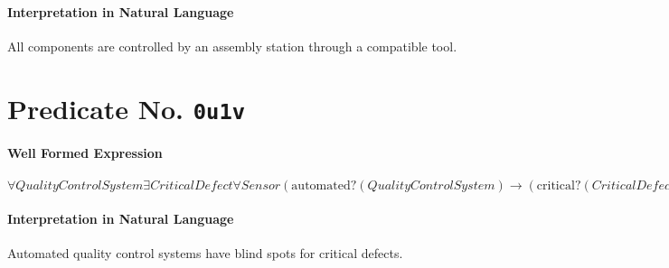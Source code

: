 \documentclass[11pt]{article}
\begin{document}
\paragraph*{Interpretation in Natural Language}
\label{sec:orgfa82711}

All components are controlled by an assembly station through a compatible tool.



\section{Predicate No. \texttt{0u1v}}
\label{sec:org2d157b3}

\paragraph*{Well Formed Expression}
\label{sec:org1137c8c}

\(\forall \mathit{QualityControlSystem} \exists \mathit{CriticalDefect} \forall \mathit{Sensor} (\mathrm{automated?}(\mathit{QualityControlSystem}) \rightarrow (\mathrm{critical?}(\mathit{CriticalDefect}) \land \neg \mathrm{detects?}(\mathit{Sensor}, \mathit{CriticalDefect})))\)

\paragraph*{Interpretation in Natural Language}
\label{sec:org12714ca}

Automated quality control systems have blind spots for critical defects.
\end{document}
